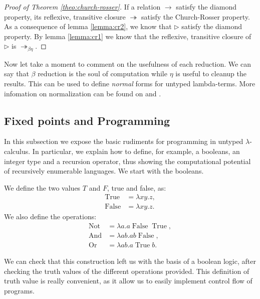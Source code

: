 \begin{proof}[Proof of Theorem \ref{theo:church-rosser}]   If a relation $\to$ satisfy the diamond property, its reflexive, transitive closure $\twoheadrightarrow$ satisfy the Church-Rosser property. As a consequence of lemma \ref{lemma:cr2}, we know that $\triangleright$ satisfy the diamond property.  By lemma \ref{lemma:cr1} we know that the reflexive, transitive closure of $\triangleright$ is $\twoheadrightarrow_{\beta\eta}$.
\end{proof}

Now let take a moment to comment on the usefulness of each reduction. We can say that $\beta$ reduction is the soul of computation  while $\eta$ is useful to cleanup the results.  This can be used to define \emph{normal} forms for untyped lambda-terms. More infomation on normalization can be found on \cite[Section 7]{selinger2008lecture} and \cite{baader1999term}. \\


\subsection{Fixed points and Programming}
In this subsection we expose the basic rudiments for programming in untyped $\lambda$-calculus. In particular, we explain how to define, for example, a booleans, an integer type and a recursion operator, thus showing the computational potential of recursively enumerable languages. We start with the booleans.

\begin{definition} \label{def:untyped-natural} 
  We define the two values $T$ and $F$, true and false, as:
  \begin{align*}
    \operatorname{True} &= \lambda xy.z,\\
    \operatorname{False} &= \lambda xy.z.
  \end{align*}
  We also define the operations:
  \begin{align*}
    \operatorname{Not} &= \lambda a.a\operatorname{False}\operatorname{True},\\
    \operatorname{And} &= \lambda ab.ab\operatorname{False},\\
    \operatorname{Or} &= \lambda ab.a\operatorname{True}b.
  \end{align*}
\end{definition}

We can check that this construction left us with the basis of a boolean logic, after checking the truth values of the different operations provided. This definition of truth value is really convenient, as it allow us to easily implement control flow of programs.

